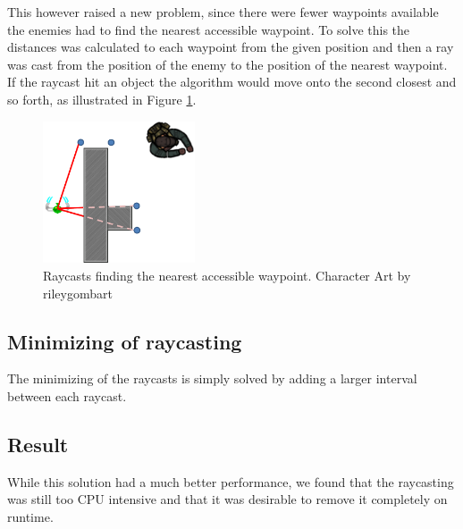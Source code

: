 This however raised a new problem, since there were fewer waypoints available the enemies had to find the nearest accessible waypoint.
To solve this the distances was calculated to each waypoint from the given position and then a ray was cast from the position of the enemy to the position of the nearest waypoint.
If the raycast hit an object the algorithm would move onto the second closest and so forth, as illustrated in Figure \ref{nearestWaypoint}.
\begin{figure}[H]
\begin{center}

	\includegraphics[width=0.4\textwidth]{figures/astar/findNearestWaypoint}
	\caption{Raycasts finding the nearest accessible waypoint. Character Art by rileygombart\cite{artist}}
	\label{nearestWaypoint}
	
\end{center}
\end{figure}

\subsection*{Minimizing of raycasting}
The minimizing of the raycasts is simply solved by adding a larger interval between each raycast.

\subsection*{Result}
While this solution had a much better performance, we found that the raycasting was still too CPU intensive and that it was desirable to remove it completely on runtime.